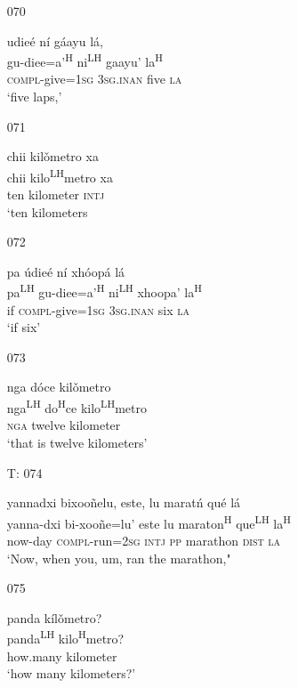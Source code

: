 \begin{itemize}
\item[070]
 
\glll   udie\'{e} n\'{i} g\'{a}ayu l\'{a},\\ 
 gu-diee=a'\textsuperscript{H} ni\textsuperscript{LH} gaayu' la\textsuperscript{H}\\
 \textsc{compl}-give=\textsc{1sg} \textsc{3sg.inan} five \textsc{la}\\
\glt `five laps,'
 

\item[071]
 
\glll   chii kil\v{o}metro xa\\
chii kilo\textsuperscript{LH}metro xa\\
 ten kilometer \textsc{intj}\\
\glt `ten kilometers
 

\item[072]
 
\glll   pa \'{u}die\'{e} n\'{i} xh\'{o}op\'{a} l\'{a}\\
pa\textsuperscript{LH} gu-diee=a'\textsuperscript{H} ni\textsuperscript{LH} xhoopa' la\textsuperscript{H}\\
 if \textsc{compl}-give=\textsc{1sg} \textsc{3sg.inan} six \textsc{la}\\
\glt `if six'
 

\item[073]
 
\glll  nga d\'{o}ce kil\v{o}metro\\
nga\textsuperscript{LH} do\textsuperscript{H}ce kilo\textsuperscript{LH}metro\\
 \textsc{nga} twelve kilometer\\
\glt `that is twelve kilometers'
 

\item[T: 074]
 
\glll   yannadxi bixoo\~{n}elu, este, lu marat\'{n} qu\'{e} l\'{a}\\
 yanna-dxi bi-xoo\~{n}e=lu' este lu maraton\textsuperscript{H} que\textsuperscript{LH} la\textsuperscript{H}\\
 now-day \textsc{compl}-run=\textsc{2sg} \textsc{intj} \textsc{pp} marathon \textsc{dist} \textsc{la}\\
\glt `Now, when you, um, ran the marathon,"
 

\item[075]
 
panda k\'{i}l\v{o}metro?\\
panda\textsuperscript{LH} kilo\textsuperscript{H}metro?\\
 how.many kilometer\\
\glt `how many kilometers?'
 



\end{itemize}
